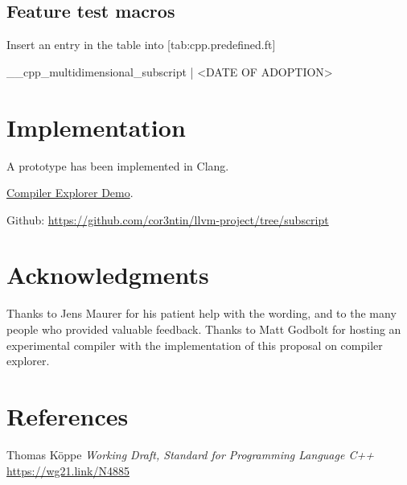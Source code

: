\documentclass{wg21}
\begin{document}
\subsection{Feature test macros}

Insert an entry in the table into [tab:cpp.predefined.ft]

\begin{addedblock}
\begin{codeblock}
__cpp_multidimensional_subscript | <DATE OF ADOPTION>
\end{codeblock}
\end{addedblock}

\section{Implementation}

A prototype has been implemented in Clang.

\href{https://gcc.godbolt.org/z/4szfLo}{Compiler Explorer Demo}.

Github: \url{https://github.com/cor3ntin/llvm-project/tree/subscript}

\section{Acknowledgments}

Thanks to Jens Maurer for his patient help with the wording, and to the many people who provided valuable feedback.
Thanks to Matt Godbolt for hosting an experimental compiler with the implementation
of this proposal on compiler explorer.

\section{References}
\renewcommand{\section}[2]{}%



\begin{thebibliography}{9}

    Thomas Köppe
    \emph{Working Draft, Standard for Programming Language C++}\newline
    \url{https://wg21.link/N4885}

\end{thebibliography}
\end{document}
